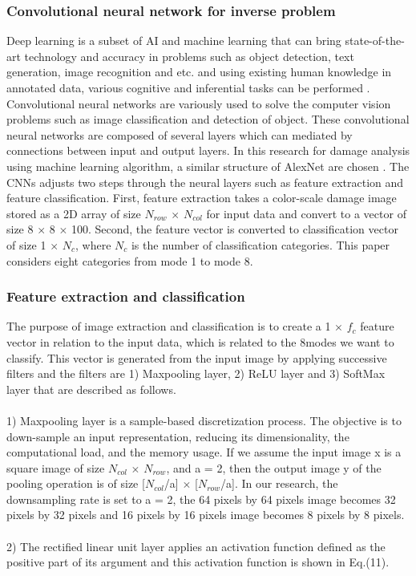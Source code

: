 \subsubsection{Convolutional neural network for inverse problem}
\label{subsubsec3}
Deep learning is a subset of AI and machine learning that can bring state-of-the-art technology and accuracy in problems such as object detection, text generation, image recognition and etc. and using existing human knowledge in annotated data, various cognitive and inferential tasks can be performed \cite{Ref20,Ref21,Ref22}. Convolutional neural networks are variously used to solve the computer vision problems such as image classification and detection of object. These convolutional neural networks are composed of several layers which can mediated by connections between input and output layers. In this research for damage analysis using machine learning algorithm, a similar structure of AlexNet are chosen \cite{Ref23}. The CNNs adjusts two steps through the neural layers such as feature extraction and feature classification. First, feature extraction takes a color-scale damage image stored as a 2D array of size $N_{row}$ $\times$ $N_{col}$ for input data and convert to a vector of size 8 $\times$ 8 $\times$ 100. Second, the feature vector is converted to classification vector of size 1 $\times$ $N_{c}$, where $N_{c}$ is the number of classification categories. This paper considers eight categories from mode 1 to mode 8.

\subsubsection{Feature extraction and classification}
\label{subsubsec3}
The purpose of image extraction and classification is to create a 1 $\times$ $f_c$ feature vector in relation to the input data, which is related to the 8modes we want to classify. This vector is generated from the input image by applying successive filters and the filters are 1) Maxpooling layer, 2) ReLU layer and 3) SoftMax layer that are described as follows.
\\
\\
1) Maxpooling layer \cite{Ref24} is a sample-based discretization process. The objective is to down-sample an input representation, reducing its dimensionality, the computational load, and the memory usage. If we assume the input image x is a square image of size $N_{col}$ $\times$ $N_{row}$, and a = 2, then the output image y of the pooling operation is of size [$N_{col}$/a] $\times$ [$N_{row}$/a]. In our research, the downsampling rate is set to a = 2,
the 64 pixels by 64 pixels image becomes 32 pixels by 32 pixels and 16 pixels by 16 pixels image becomes 8 pixels by 8 pixels.
\\
\\
2) The rectified linear unit layer \cite{Ref25} applies an activation function defined as the positive part of its argument and this activation function is shown in Eq.(11).

